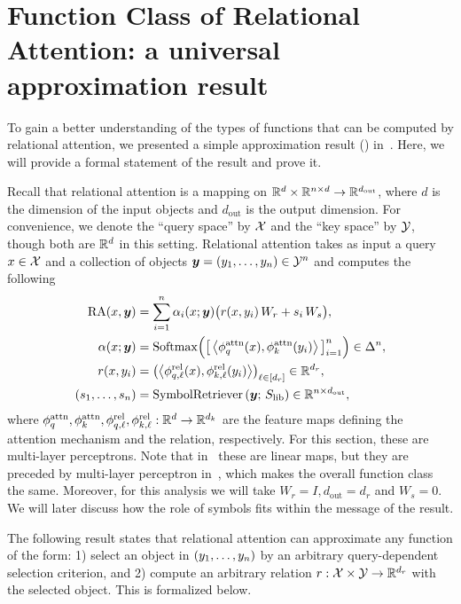\section{Function Class of Relational Attention: a universal approximation result}\label{sec:approx}

To gain a better understanding of the types of functions that can be computed by relational attention, we presented a simple approximation result () in~. Here, we will provide a formal statement of the result and prove it.

Recall that relational attention is a mapping on $\mathbb{R}^d \times \mathbb{R}^{n \times d} \to \mathbb{R}^{d_{\mathrm{out}}}$, where $d$ is the dimension of the input objects and $d_{\mathrm{out}}$ is the output dimension. For convenience, we denote the ``query space'' by ${\mathcal{X}}$ and the ``key space'' by ${\mathcal{Y}}$, though both are $\mathbb{R}^d$ in this setting. Relational attention takes as input a query $x \in {\mathcal{X}}$ and a collection of objects $\bm{y} = (y_1, \ldots, y_n) \in {\mathcal{Y}}^n$ and computes the following
\begin{align}
  \mathrm{RA}(x, \bm{y}) &= \sum_{i=1}^{n} \alpha_i(x; \bm{y}) \big(r(x, y_i) \, W_r +  s_i \, W_s\big), \\
  \alpha(x; \bm{y}) &= \mathrm{Softmax}\Big(\big[\left \langle \phi_q^{\mathrm{attn}}(x), \phi_k^{\mathrm{attn}}(y_i) \right\rangle\big]_{i=1}^{n}\Big) \in \Delta^n, \\
  r(x, y_i) &= \left(\left \langle \phi_{q,\ell}^{\mathrm{rel}}(x), \phi_{k,\ell}^{\mathrm{rel}}(y_i) \right\rangle\right)_{\ell \in [d_r]} \in \mathbb{R}^{d_r}, \\
  (s_1, \ldots, s_n) &= \mathrm{SymbolRetriever}\left(\bm{y};\, S_\mathrm{lib}\right) \in \mathbb{R}^{n \times d_{\mathrm{out}}},
\end{align}
where $\phi_q^{\mathrm{attn}}, \phi_k^{\mathrm{attn}}, \phi_{q,\ell}^{\mathrm{rel}}, \phi_{k,\ell}^{\mathrm{rel}}: \mathbb{R}^{d} \to \mathbb{R}^{d_k}$ are the feature maps defining the attention mechanism and the relation, respectively. For this section, these are multi-layer perceptrons. Note that in~ these are linear maps, but they are preceded by multi-layer perceptron in~, which makes the overall function class the same. Moreover, for this analysis we will take $W_r = I, d_{\mathrm{out}} = d_r$ and $W_s = 0$. We will later discuss how the role of symbols fits within the message of the result.

The following result states that relational attention can approximate any function of the form: 1) select an object in $(y_1, \ldots, y_n)$ by an arbitrary query-dependent selection criterion, and 2) compute an arbitrary relation $r: {\mathcal{X}} \times {\mathcal{Y}} \to \mathbb{R}^{d_r}$ with the selected object. This is formalized below.

